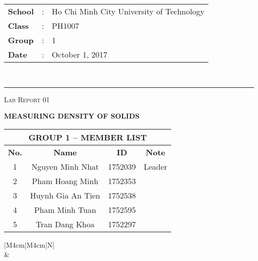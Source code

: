 \documentclass[12pt, a4paper]{article}
\begin{document}
\noindent
\begin{tabular}{lll}
    \textbf{School} & : & Ho Chi Minh City University of Technology \\
    \textbf{Class} & : & PH1007 \\
    \textbf{Group} & : & 1 \\
    \textbf{Date} & : & October 1, 2017 \\
\end{tabular}\\
\rule[2ex]{\textwidth}{2pt}

\vspace{2.5cm}

\begin{center}
    {\scshape\Large Lab Report 01 \par}
    \vspace{1.5cm}
    {\Huge\bfseries MEASURING DENSITY OF SOLIDS \par}

    \vspace{3cm}

    \begin{tabular}{|c|c|c|c|}
        \hline 
        \multicolumn{4}{|c|}{\textbf{GROUP 1 -- MEMBER LIST}} \\ 
        \hline 
        \textbf{No.} &\qquad\qquad \textbf{Name}\qquad\qquad\qquad & \qquad\textbf{ID}\qquad\qquad & \qquad\textbf{Note}\qquad\qquad \\ 
        \hline 
        1 & Nguyen Minh Nhat  & 1752039 & Leader \\ 
        \hline 
        2 & Pham Hoang Minh   & 1752353 &  \\ 
        \hline 
        3 & Huynh Gia An Tien & 1752538 &  \\ 
        \hline 
        4 & Pham Minh Tuan    & 1752595 &  \\ 
        \hline 
        5 & Tran Dang Khoa    & 1752297 &  \\ 
        \hline 
    \end{tabular} 

    \vspace{4cm}

    \begin{table}[ht]
        \centering
        \begin{tabular}{|M{4cm}|M{4cm}|N|}
            \hline
             \\
            \hline
             &  \\ [50pt]
            \hline
        \end{tabular}
    \end{table}
\end{center}
\end{document}
